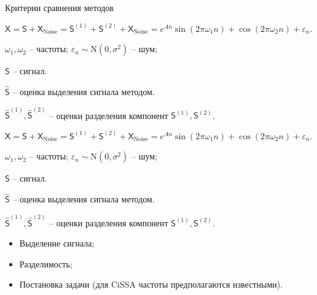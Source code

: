 \documentclass[notheorems, handout]{beamer}
\newcommand{\TS}{\mathsf{X}}
\begin{document}
	\begin{frame}{Критерии сравнения методов}

		\textbf{} 
			$\TS = \mathsf{S} + \TS_{\mathrm{Noise}}=
			\mathsf{S}^{(1)} + \mathsf{S}^{(2)} + \TS_{\mathrm{Noise}}= 
			e^{A{n}}
			\sin\left({2\pi\omega_1 n}\right) + 
			\cos\left({2\pi\omega_2 n}\right) + \varepsilon_n$.

			$\omega_1, \omega_2$ -- частоты;
			$\varepsilon_n \sim \mathrm N(0, \sigma^2)$ -- шум; 

			$\mathsf{S}$ -- сигнал.

			$\hat{\mathsf{S}}$ -- оценка выделения сигнала методом.

			$\hat{\mathsf{S}}^{(1)}, 
			\hat{\mathsf{S}}^{(2)}$ -- оценки разделения компонент $\mathsf{S}^{(1)}, \mathsf{S}^{(2)}$.

		$\TS = \mathsf{S} + \TS_{\mathrm{Noise}}=
		\mathsf{S}^{(1)} + \mathsf{S}^{(2)} + \TS_{\mathrm{Noise}}= 
		e^{A{n}}
		\sin\left({2\pi\omega_1 n}\right) + 
		\cos\left({2\pi\omega_2 n}\right) + \varepsilon_n$.

		$\omega_1, \omega_2$ -- частоты;
		$\varepsilon_n \sim \mathrm N(0, \sigma^2)$ -- шум; 

		$\mathsf{S}$ -- сигнал.

		$\hat{\mathsf{S}}$ -- оценка выделения сигнала методом.

		$\hat{\mathsf{S}}^{(1)}, 
		\hat{\mathsf{S}}^{(2)}$ -- оценки разделения компонент $\mathsf{S}^{(1)}, \mathsf{S}^{(2)}$.

		\bigskip

		\textbf{}
		\begin{itemize}
			\item Выделение сигнала;
			\item Разделимость;
			\item Постановка задачи (для CiSSA частоты предполагаются известными).
		\end{itemize}
		
	\end{frame}
\end{document}
